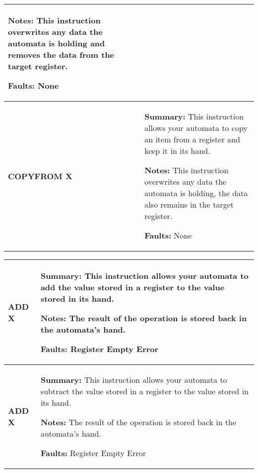 \begin{center}
\begin{tabular}{ | m{3cm} | m{11cm} | }
    
            \textbf{Notes:} 
            \newline This instruction overwrites any data the automata is holding and removes the data from the target register.
    
            \textbf{Faults:}
            \newline None\\
        \hline
            \begin{center}
                \textbf{COPYFROM X} 
            \end{center}& 
            \textbf{Summary:} 
            \newline This instruction allows your automata to copy an item from a register and keep it in its hand.
    
            \textbf{Notes:} 
            \newline This instruction overwrites any data the automata is holding, the data also remains in the target register.
    
            \textbf{Faults:}
            \newline None\\
        \hline
    \end{tabular}

    \begin{tabular}{ | m{3cm} | m{11cm} | } 
        \hline
            \begin{center}
                \textbf{ADD X} 
            \end{center}& 
            \textbf{Summary:} 
            \newline This instruction allows your automata to add the value stored in a register to the value stored in its hand.
    
            \textbf{Notes:} 
            \newline The result of the operation is stored back in the automata’s hand.
    
            \textbf{Faults:}
            \newline Register Empty Error\\
        \hline
            \begin{center}
                \textbf{ADD X} 
            \end{center}& 
            \textbf{Summary:} 
            \newline This instruction allows your automata to subtract the value stored in a register to the value stored in its hand.

            \textbf{Notes:} 
            \newline The result of the operation is stored back in the automata’s hand.

            \textbf{Faults:}
            \newline Register Empty Error\\
        \hline
    \end{tabular}
\end{center}
\newpage
